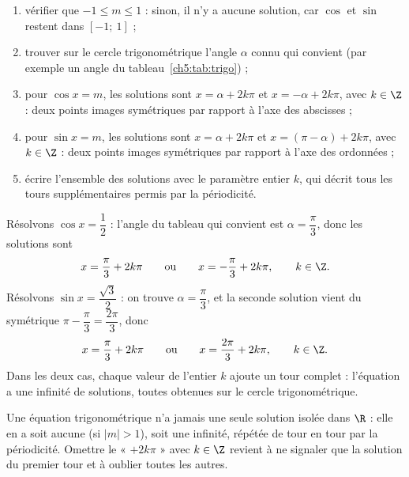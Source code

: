 \begin{methode}[résoudre $\cos x = m$ et $\sin x = m$ dans $\R$]
\begin{enumerate}
  \item vérifier que $-1 \leqslant m \leqslant 1$ : sinon, il n'y a aucune solution, car $\cos$ et $\sin$ restent dans $[-1;\ 1]$ ;
  \item trouver sur le cercle trigonométrique l'angle $\alpha$ connu qui convient (par exemple un angle du tableau~\ref{ch5:tab:trigo}) ;
  \item pour $\cos x = m$, les solutions sont $x = \alpha + 2k\pi$ et $x = -\alpha + 2k\pi$, avec $k \in \Z$ : deux points images symétriques par rapport à l'axe des abscisses ;
  \item pour $\sin x = m$, les solutions sont $x = \alpha + 2k\pi$ et $x = (\pi - \alpha) + 2k\pi$, avec $k \in \Z$ : deux points images symétriques par rapport à l'axe des ordonnées ;
  \item écrire l'ensemble des solutions avec le paramètre entier $k$, qui décrit tous les tours supplémentaires permis par la périodicité.
\end{enumerate}
\end{methode}

\begin{exemple}
Résolvons $\cos x = \dfrac{1}{2}$ : l'angle du tableau qui convient est $\alpha = \dfrac{\pi}{3}$, donc les solutions sont
\[
x = \frac{\pi}{3} + 2k\pi \qquad\text{ou}\qquad x = -\frac{\pi}{3} + 2k\pi, \qquad k \in \Z .
\]
Résolvons $\sin x = \dfrac{\sqrt{3}}{2}$ : on trouve $\alpha = \dfrac{\pi}{3}$, et la seconde solution vient du symétrique $\pi - \dfrac{\pi}{3} = \dfrac{2\pi}{3}$, donc
\[
x = \frac{\pi}{3} + 2k\pi \qquad\text{ou}\qquad x = \frac{2\pi}{3} + 2k\pi, \qquad k \in \Z .
\]
Dans les deux cas, chaque valeur de l'entier $k$ ajoute un tour complet : l'équation a une infinité de solutions, toutes obtenues sur le cercle trigonométrique.
\end{exemple}

\begin{attention}
Une équation trigonométrique n'a jamais une seule solution isolée dans $\R$ : elle en a soit aucune (si $|m| > 1$), soit une infinité, répétée de tour en tour par la périodicité. Omettre le « $+ 2k\pi$ » avec $k \in \Z$ revient à ne signaler que la solution du premier tour et à oublier toutes les autres.
\end{attention}

